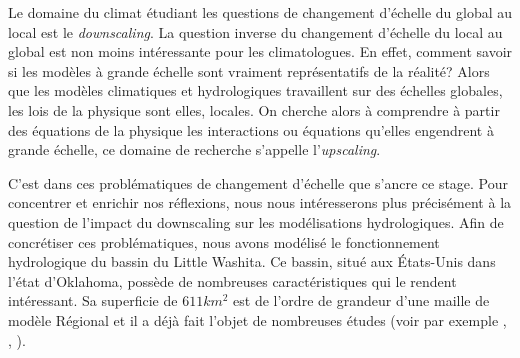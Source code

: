 \documentclass[a4paper,11pt]{article}
\numberwithin{equation}{section}
\begin{document}
Le domaine du climat étudiant les questions de changement d'échelle du global au local est le \textit{downscaling}. La question inverse du changement d'échelle du local au global est non moins intéressante pour les climatologues. En effet, comment savoir si les modèles à grande échelle sont vraiment représentatifs de la réalité? Alors que les modèles climatiques et hydrologiques travaillent sur des échelles globales, les lois de la physique sont elles, locales. On cherche alors à comprendre à partir des équations de la physique les interactions ou équations qu'elles engendrent à grande échelle, ce domaine de recherche s'appelle l'\textit{upscaling}. 

C'est dans ces problématiques de changement d'échelle que s'ancre ce stage. Pour concentrer et enrichir nos réflexions, nous nous intéresserons plus précisément à la question de l'impact du downscaling sur les modélisations hydrologiques. Afin de concrétiser ces problématiques, nous avons modélisé le fonctionnement hydrologique du bassin du Little Washita. 
Ce bassin, situé aux États-Unis dans l’état d’Oklahoma, possède de nombreuses caractéristiques qui le rendent intéressant. Sa superficie de $611km^2$ est de l'ordre de grandeur d'une maille de modèle Régional et il a déjà fait l'objet de nombreuses études (voir par exemple \cite{maxwell2007groundwater}, \cite{rosero2011ensemble}, \cite{maquin2016developpement}). 

\vspace{0.7cm}
\end{document}
